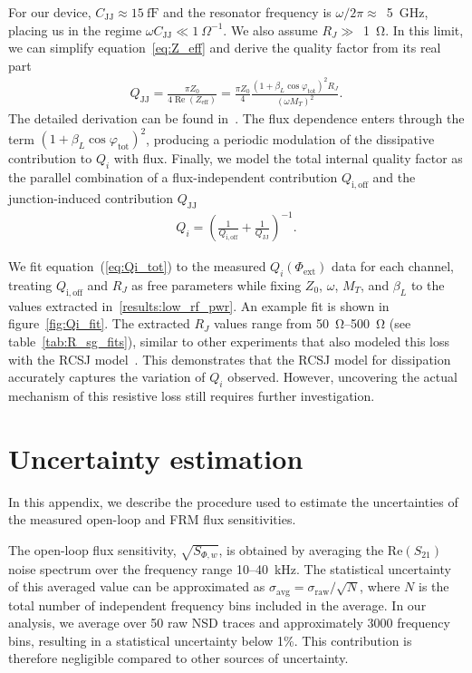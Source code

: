 \documentclass[
 prd,
 reprint,
 superscriptaddress,
 amsmath,amssymb,
 aps,
 floatfix,
]{revtex4-2}
\begin{document}
For our device, $C_{\mathrm{JJ}} \approx 15~\mathrm{fF}$ and the resonator frequency is $\omega/2\pi \approx$~\qty{5}{\GHz}, placing us in the regime $\omega C_{\mathrm{JJ}} \ll 1~\Omega^{-1}$. We also assume $R_J \gg$~\qty{1}{\ohm}. In this limit, we can simplify equation~\eqref{eq:Z_eff} and derive the quality factor from its real part
\begin{gather}
Q_{\mathrm{JJ}} =
\frac{\pi Z_0}{4 \operatorname{Re}(Z_{\mathrm{eff}})}
=
\frac{\pi Z_0}{4}
\frac{(1 + \beta_L \cos \varphi_{\mathrm{tot}})^2 R_J}
{(\omega M_T)^2}.
\label{eq:QJJ}
\end{gather}
The detailed derivation can be found in~\cite{mates_microwave_2011}. The flux dependence enters through the term $(1 + \beta_L \cos \varphi_{\mathrm{tot}})^2$, producing a periodic modulation of the dissipative contribution to $Q_i$ with flux. Finally, we model the total internal quality factor as the parallel combination of a flux-independent contribution $Q_{\mathrm{i,off}}$ and the junction-induced contribution $Q_{\mathrm{JJ}}$ ~\cite{kempf_design_2017}
\begin{gather}
Q_i =
\left(
\frac{1}{Q_{\mathrm{i,off}}}
+
\frac{1}{Q_{\mathrm{JJ}}}
\right)^{-1}.
\label{eq:Qi_tot}
\end{gather}

We fit equation~(\ref{eq:Qi_tot}) to the measured $Q_i(\Phi_{\mathrm{ext}})$ data for each channel, treating $Q_{\mathrm{i,off}}$ and $R_J$ as free parameters while fixing $Z_0$, $\omega$, $M_T$, and $\beta_L$ to the values extracted in~\cref{results:low_rf_pwr}. An example fit is shown in figure~\ref{fig:Qi_fit}. The extracted $R_J$ values range from \qty{50}{\ohm}--\qty{500}{\ohm} (see table~\ref{tab:R_sg_fits}), similar to other experiments that also modeled this loss with the RCSJ model~\cite{kempf_design_2017}. This demonstrates that the RCSJ model for dissipation accurately captures the variation of $Q_i$ observed. However, uncovering the actual mechanism of this resistive loss still requires further investigation.



\section{Uncertainty estimation} \label{appx:uncertainties}
In this appendix, we describe the procedure used to estimate the uncertainties of the measured open-loop and FRM flux sensitivities.

The open-loop flux sensitivity, $\sqrt{S_{\Phi,w}}$, is obtained by averaging the $\mathrm{Re}(S_{21})$ noise spectrum over the frequency range 10--\qty{40}{\kHz}. The statistical uncertainty of this averaged value can be approximated as \mbox{$\sigma_{\mathrm{avg}} = \sigma_{\mathrm{raw}}/\sqrt{N}$}, where $N$ is the total number of independent frequency bins included in the average. In our analysis, we average over 50 raw NSD traces and approximately 3000 frequency bins, resulting in a statistical uncertainty below 1\%. This contribution is therefore negligible compared to other sources of uncertainty.
\end{document}
